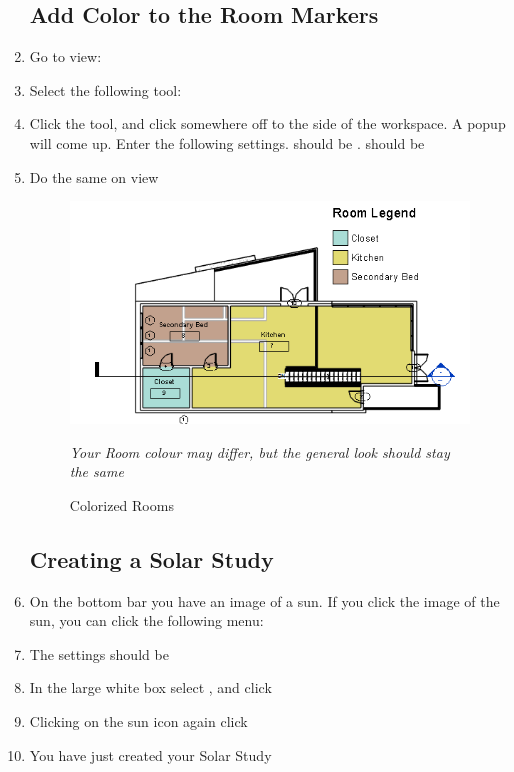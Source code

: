 \documentclass{tufte-book} %
\begin{document}
\begin{enumerate}
	\subsection{Add Color to the Room Markers}
		\item Go to view: 
		\item Select the following tool: 
		\item Click the tool, and click somewhere off to the side of the workspace. A popup will come up. Enter the following settings.  should be .  should be 
		\item Do the same on view 
		
		\begin{figure}
			\includegraphics[width=\linewidth]{revitroomcolorfinal.png}
			\caption{Colorized Rooms}
			\emph{Your Room colour may differ, but the general look should stay the same}
			\label{fig:revroomcolor}
		\end{figure}
		
	\subsection{Creating a Solar Study}
		\item On the bottom bar you have an image of a sun. If you click the image of the sun, you can click the following menu: 
		\item The settings should be 
		\item In the large white box select , and click 
		\item Clicking on the sun icon again click 
		\item You have just created your Solar Study
		

\end{enumerate}
\end{document}

